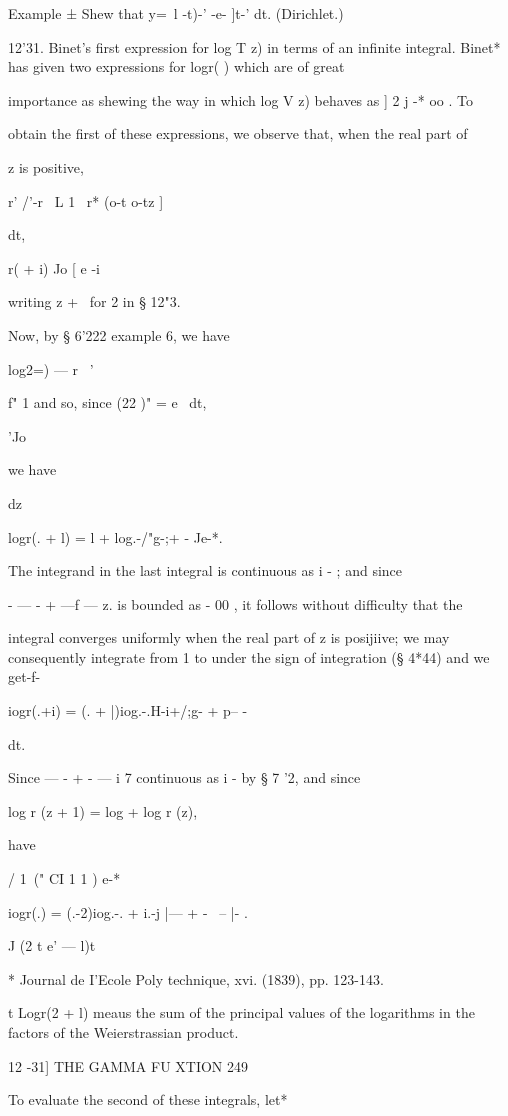 Example ± Shew that y=\ l -t)-' -e- ]t-' dt. (Dirichlet.)

12'31. Binet's first expression for log T z) in terms of an infinite
integral. Binet* has given two expressions for logr( ) which are of
great

importance as shewing the way in which log V z) behaves as ] 2 j -* oo
. To

obtain the first of these expressions, we observe that, when the real
part of

z is positive,

r' /'-r \ L 1 \ r* (o-t o-tz ]

dt,

r( + i) Jo [ e -i

writing z + \ for 2 in § 12"3.

Now, by § 6'222 example 6, we have

log2=) — r~ '

f" 1 and so, since (22 )" = e~ dt,

'Jo

we have

dz

logr(. + l) = l + log.-/"g-;+ - Je-*.

The integrand in the last integral is continuous as i - ; and since

- — - + —f — z. is bounded as - 00 , it follows without difficulty
that the

integral converges uniformly when the real part of z is posijiive; we
may consequently integrate from 1 to under the sign of integration (§
4*44) and we get-f-

iogr(.+i) = (. + |)iog.-.H-i+/;g- + p-- -

dt.

Since — - + - — i 7 continuous as i - by § 7 '2, and since

log r (z + 1) = log + log r (z),

have

/ 1\ (" CI 1 1 ) e-*

iogr(.) = (.-2)iog.-. + i.-j |--- + - \ -- |- .

J (2 t e' — l)t

* Journal de I'Ecole Poly technique, xvi. (1839), pp. 123-143.

t Logr(2 + l) meaus the sum of the principal values of the logarithms
in the factors of the Weierstrassian product.

12 -31] THE GAMMA FU XTION 249

To evaluate the second of these integrals, let*

